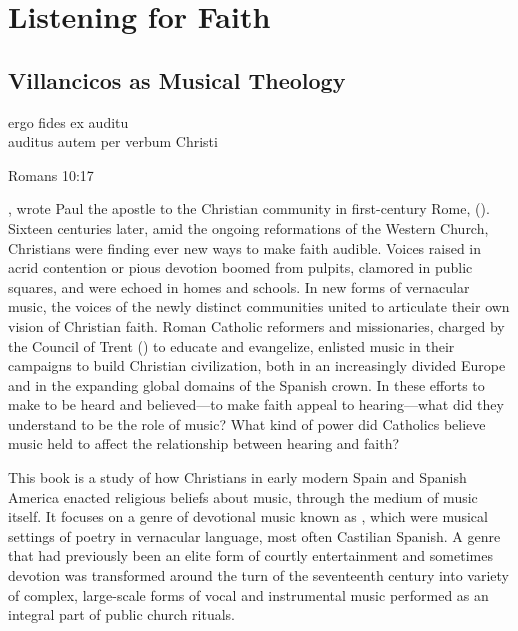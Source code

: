 
% 

\part{Listening for Faith}
\label{part:faith}

\chapter{Villancicos as Musical Theology}
\label{ch:intro}

\epigraph
{ergo fides ex auditu\\
auditus autem per verbum Christi}
{Romans 10:17}

, wrote Paul the apostle to the Christian
community in first-century Rome,  ().
Sixteen centuries later, amid the ongoing reformations of the Western Church,
Christians were finding ever new ways to make faith audible.
Voices raised in acrid contention or pious devotion boomed from pulpits,
clamored in public squares, and were echoed in homes and schools.  
In new forms of vernacular music, the voices of the newly distinct communities
united to articulate their own vision of Christian faith.
Roman Catholic reformers and missionaries, charged by the Council of
Trent (\XXX[years]) to educate and evangelize, enlisted music in their
campaigns to build Christian civilization, both in an increasingly divided
Europe and in the expanding global domains of the Spanish crown.
In these efforts to make  to be heard and
believed---to make faith appeal to hearing---what did they understand to be the
role of music?
What kind of power did Catholics believe music held to affect the relationship
between hearing and faith?

This book is a study of how Christians in early modern Spain and Spanish
America enacted religious beliefs about music, through the medium of music
itself.
It focuses on a genre of devotional music known as , which
were musical settings of poetry in vernacular language, most often Castilian
Spanish.
A genre that had previously been an elite form of courtly entertainment and
sometimes devotion was transformed around the turn of the seventeenth century
into variety of complex, large-scale forms of vocal and instrumental music
performed as an integral part of public church rituals.

